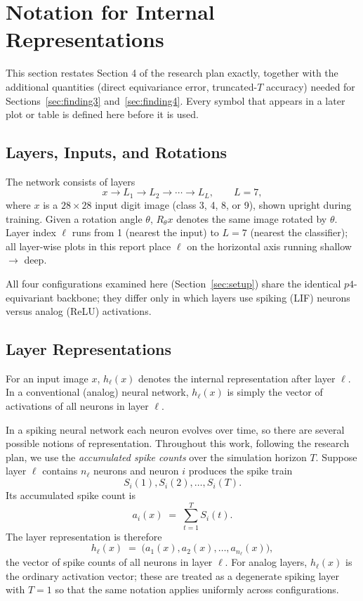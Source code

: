 \documentclass[11pt]{article}
\begin{document}
\section{Notation for Internal Representations}
\label{sec:notation}

This section restates Section 4 of the research plan exactly, together with the additional
quantities (direct equivariance error, truncated-$T$ accuracy) needed for Sections~\ref{sec:finding3}
and~\ref{sec:finding4}. Every symbol that appears in a later plot or table is defined here before it
is used.

\subsection{Layers, Inputs, and Rotations}

The network consists of layers
\[
x \to L_1 \to L_2 \to \cdots \to L_L, \qquad L = 7,
\]
where $x$ is a $28 \times 28$ input digit image (class 3, 4, 8, or 9), shown upright during training.
Given a rotation angle $\theta$, $R_\theta x$ denotes the same image rotated by $\theta$. Layer index
$\ell$ runs from 1 (nearest the input) to $L = 7$ (nearest the classifier); all layer-wise plots in
this report place $\ell$ on the horizontal axis running shallow $\to$ deep.

All four configurations examined here (Section~\ref{sec:setup}) share the identical $p4$-equivariant
backbone; they differ only in which layers use spiking (LIF) neurons versus analog (ReLU)
activations.

\subsection{Layer Representations}

For an input image $x$, $h_\ell(x)$ denotes the internal representation after layer $\ell$. In a
conventional (analog) neural network, $h_\ell(x)$ is simply the vector of activations of all neurons
in layer $\ell$.

In a spiking neural network each neuron evolves over time, so there are several possible notions of
representation. Throughout this work, following the research plan, we use the \emph{accumulated
spike counts} over the simulation horizon $T$. Suppose layer $\ell$ contains $n_\ell$ neurons and
neuron $i$ produces the spike train
\[
S_i(1), S_i(2), \ldots, S_i(T).
\]
Its accumulated spike count is
\begin{equation}
a_i(x) \;=\; \sum_{t=1}^{T} S_i(t). \label{eq:1}
\end{equation}
The layer representation is therefore
\[
h_\ell(x) \;=\; \big(a_1(x), a_2(x), \ldots, a_{n_\ell}(x)\big),
\]
the vector of spike counts of all neurons in layer $\ell$. For analog layers, $h_\ell(x)$ is the
ordinary activation vector; these are treated as a degenerate spiking layer with $T = 1$ so that the
same notation applies uniformly across configurations.
\end{document}
